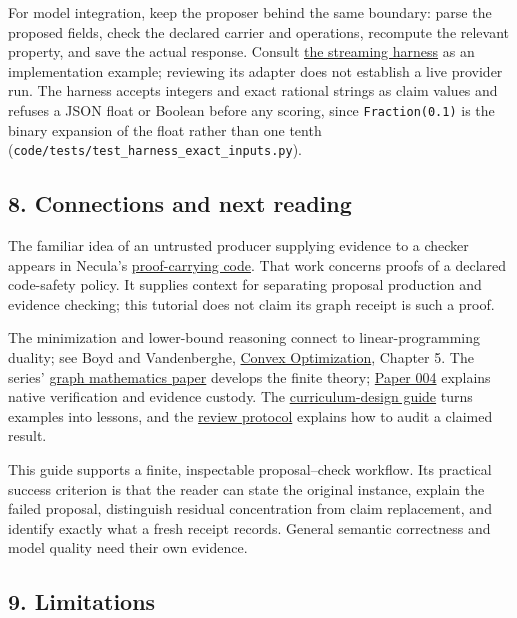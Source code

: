 \documentclass[
  11pt,
]{article}
\newcommand{\passthrough}[1]{#1}
\begin{document}
For model integration, keep the proposer behind the same boundary: parse
the proposed fields, check the declared carrier and operations,
recompute the relevant property, and save the actual response. Consult
\href{https://github.com/dbccpage/the_symbol_game/blob/52cb5457f6c485ba548cfd292f6012a941ed22cf/atlas/coda_atlas/symbol_game/005_pfp_practitioners_field_manual/code/llm_streaming_harness.py}{the
streaming harness} as an implementation example; reviewing its adapter
does not establish a live provider run. The harness accepts integers and
exact rational strings as claim values and refuses a JSON float or
Boolean before any scoring, since
\passthrough{\lstinline!Fraction(0.1)!} is the binary expansion of the
float rather than one tenth
(\nolinkurl{code/tests/test_harness_exact_inputs.py}).

\subsection{8. Connections and next
reading}\label{connections-and-next-reading}

The familiar idea of an untrusted producer supplying evidence to a
checker appears in Necula's
\href{https://doi.org/10.1145/263699.263712}{proof-carrying code}. That
work concerns proofs of a declared code-safety policy. It supplies
context for separating proposal production and evidence checking; this
tutorial does not claim its graph receipt is such a proof.

The minimization and lower-bound reasoning connect to linear-programming
duality; see Boyd and Vandenberghe,
\href{https://doi.org/10.1017/CBO9780511804441}{Convex Optimization},
Chapter 5. The series' \href{../001/paper.pdf}{graph mathematics paper}
develops the finite theory; \href{../004/paper.pdf}{Paper 004} explains
native verification and evidence custody. The
\href{../007/paper.pdf}{curriculum-design guide} turns examples into
lessons, and the \href{../009/paper.pdf}{review protocol} explains how
to audit a claimed result.

This guide supports a finite, inspectable proposal--check workflow. Its
practical success criterion is that the reader can state the original
instance, explain the failed proposal, distinguish residual
concentration from claim replacement, and identify exactly what a fresh
receipt records. General semantic correctness and model quality need
their own evidence.

\subsection{9. Limitations}\label{limitations}
\end{document}
